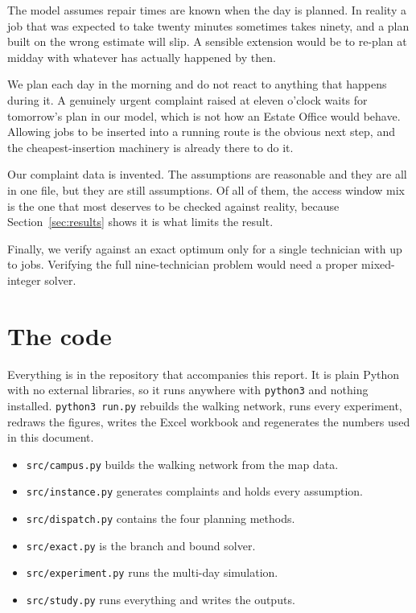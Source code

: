 \documentclass[11pt]{article}
\begin{document}
The model assumes repair times are known when the day is planned. In reality
a job that was expected to take twenty minutes sometimes takes ninety, and a
plan built on the wrong estimate will slip. A sensible extension would be to
re-plan at midday with whatever has actually happened by then.

We plan each day in the morning and do not react to anything that happens
during it. A genuinely urgent complaint raised at eleven o'clock waits for
tomorrow's plan in our model, which is not how an Estate Office would
behave. Allowing jobs to be inserted into a running route is the obvious next
step, and the cheapest-insertion machinery is already there to do it.

Our complaint data is invented. The assumptions are reasonable and they are
all in one file, but they are still assumptions. Of all of them, the access
window mix is the one that most deserves to be checked against reality,
because Section~\ref{sec:results} shows it is what limits the result.

Finally, we verify against an exact optimum only for a single technician with
up to \NBbMaxTickets{} jobs. Verifying the full nine-technician problem would
need a proper mixed-integer solver.

\section{The code}

Everything is in the repository that accompanies this report. It is plain
Python with no external libraries, so it runs anywhere with
\texttt{python3} and nothing installed. \texttt{python3 run.py} rebuilds the
walking network, runs every experiment, redraws the figures, writes the Excel
workbook and regenerates the numbers used in this document.

\begin{itemize}\small
\item \texttt{src/campus.py} builds the walking network from the map data.
\item \texttt{src/instance.py} generates complaints and holds every assumption.
\item \texttt{src/dispatch.py} contains the four planning methods.
\item \texttt{src/exact.py} is the branch and bound solver.
\item \texttt{src/experiment.py} runs the multi-day simulation.
\item \texttt{src/study.py} runs everything and writes the outputs.
\end{itemize}
\end{document}
